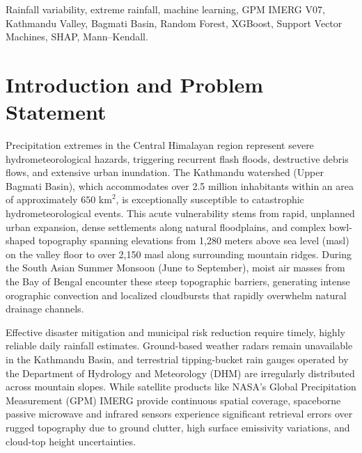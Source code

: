 \documentclass[conference]{IEEEtran}
\begin{document}
\begin{IEEEkeywords}
Rainfall variability, extreme rainfall, machine learning, GPM IMERG V07, Kathmandu Valley, Bagmati Basin, Random Forest, XGBoost, Support Vector Machines, SHAP, Mann--Kendall.
\end{IEEEkeywords}


\section{Introduction and Problem Statement}
\label{sec:introduction}
Precipitation extremes in the Central Himalayan region represent severe hydrometeorological hazards, triggering recurrent flash floods, destructive debris flows, and extensive urban inundation. The Kathmandu watershed (Upper Bagmati Basin), which accommodates over 2.5 million inhabitants within an area of approximately $650\text{ km}^2$, is exceptionally susceptible to catastrophic hydrometeorological events. This acute vulnerability stems from rapid, unplanned urban expansion, dense settlements along natural floodplains, and complex bowl-shaped topography spanning elevations from 1,280 meters above sea level (masl) on the valley floor to over 2,150 masl along surrounding mountain ridges. During the South Asian Summer Monsoon (June to September), moist air masses from the Bay of Bengal encounter these steep topographic barriers, generating intense orographic convection and localized cloudbursts that rapidly overwhelm natural drainage channels.

Effective disaster mitigation and municipal risk reduction require timely, highly reliable daily rainfall estimates. Ground-based weather radars remain unavailable in the Kathmandu Basin, and terrestrial tipping-bucket rain gauges operated by the Department of Hydrology and Meteorology (DHM) are irregularly distributed across mountain slopes. While satellite products like NASA's Global Precipitation Measurement (GPM) IMERG provide continuous spatial coverage, spaceborne passive microwave and infrared sensors experience significant retrieval errors over rugged topography due to ground clutter, high surface emissivity variations, and cloud-top height uncertainties.
\end{document}
